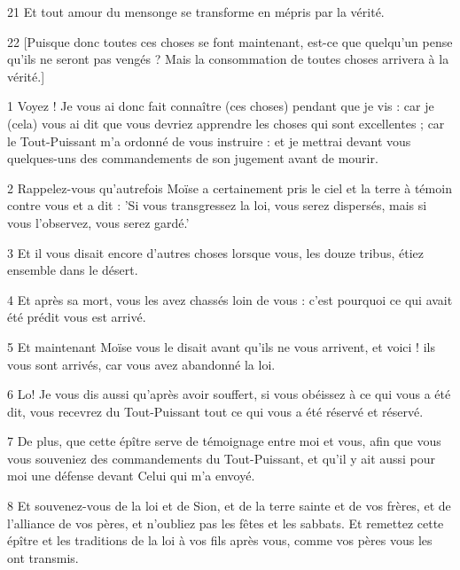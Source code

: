\par 21 Et tout amour du mensonge se transforme en mépris par la vérité.

\par 22 [Puisque donc toutes ces choses se font maintenant, est-ce que quelqu'un pense qu'ils ne seront pas vengés ? Mais la consommation de toutes choses arrivera à la vérité.]


\par 1 Voyez ! Je vous ai donc fait connaître (ces choses) pendant que je vis : car je (cela) vous ai dit que vous devriez apprendre les choses qui sont excellentes ; car le Tout-Puissant m'a ordonné de vous instruire : et je mettrai devant vous quelques-uns des commandements de son jugement avant de mourir.

\par 2 Rappelez-vous qu'autrefois Moïse a certainement pris le ciel et la terre à témoin contre vous et a dit : 'Si vous transgressez la loi, vous serez dispersés, mais si vous l'observez, vous serez gardé.'

\par 3 Et il vous disait encore d'autres choses lorsque vous, les douze tribus, étiez ensemble dans le désert.

\par 4 Et après sa mort, vous les avez chassés loin de vous : c'est pourquoi ce qui avait été prédit vous est arrivé.

\par 5 Et maintenant Moïse vous le disait avant qu'ils ne vous arrivent, et voici ! ils vous sont arrivés, car vous avez abandonné la loi.

\par 6 Lo! Je vous dis aussi qu'après avoir souffert, si vous obéissez à ce qui vous a été dit, vous recevrez du Tout-Puissant tout ce qui vous a été réservé et réservé.

\par 7 De plus, que cette épître serve de témoignage entre moi et vous, afin que vous vous souveniez des commandements du Tout-Puissant, et qu'il y ait aussi pour moi une défense devant Celui qui m'a envoyé.

\par 8 Et souvenez-vous de la loi et de Sion, et de la terre sainte et de vos frères, et de l'alliance de vos pères, et n'oubliez pas les fêtes et les sabbats. Et remettez cette épître et les traditions de la loi à vos fils après vous, comme vos pères vous les ont transmis.

